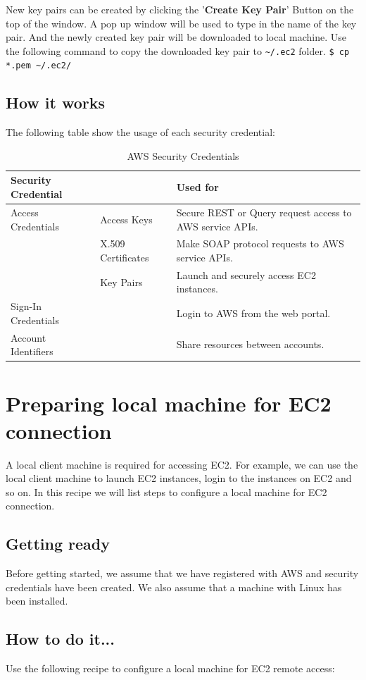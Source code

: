 New key pairs can be created by clicking the '\textbf{Create Key Pair}' Button on the top of the window. A pop up window will be used to type in the name of the key pair. And the newly created key pair will be downloaded to local machine.
Use the following command to copy the downloaded key pair to \verb|~/.ec2| folder.
\verb|$ cp *.pem ~/.ec2/|

\subsection*{How it works}
The following table show the usage of each security credential:
\begin{table}[h]
  \footnotesize
  \centering
  \begin{tabular}{lll}
    \toprule
    \textbf{Security Credential} & & \textbf{Used for} \\ \midrule
    Access Credentials & Access Keys & Secure REST or Query request access to AWS service APIs. \\
    & X.509 Certificates & Make SOAP protocol requests to AWS service APIs. \\
    & Key Pairs & Launch and securely access EC2 instances. \\
    Sign-In Credentials  & & Login to AWS from the web portal. \\
    Account Identifiers  & & Share resources between accounts. \\ \bottomrule
  \end{tabular}
  \caption{AWS Security Credentials}\label{tbl:awssecurity}
\end{table}

\section{Preparing local machine for EC2 connection}
A local client machine is required for accessing EC2. For example, we can use the local client machine to launch EC2 instances, login to the instances on EC2 and so on. In this recipe we will list steps to configure a local machine for EC2 connection.
\subsection*{Getting ready}
Before getting started, we assume that we have registered with AWS and security credentials have been created. We also assume that a machine with Linux has been installed.
\subsection*{How to do it...}
Use the following recipe to configure a local machine for EC2 remote access:


